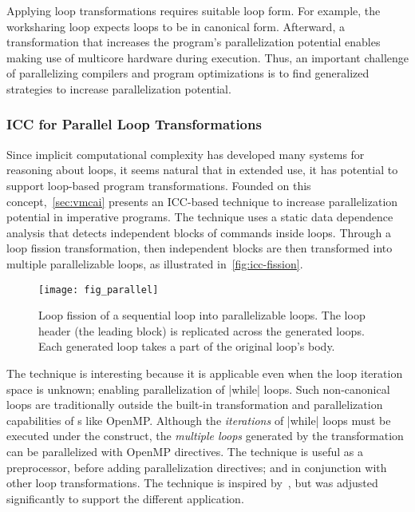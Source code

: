 Applying loop transformations requires suitable loop form.
For example, the worksharing loop expects loops to be in canonical form.
Afterward, a transformation that increases the program's parallelization potential enables making use of multicore hardware during execution.
Thus, an important challenge of parallelizing compilers and program optimizations is to find generalized strategies to increase parallelization potential.

\subsubsection{ICC for Parallel Loop Transformations}
\label{icc-fission}

Since implicit computational complexity has developed many systems for reasoning about loops, it seems natural that in extended use, it has potential to support loop-based program transformations.
Founded on this concept,~\autoref{sec:vmcai} presents an ICC-based technique to increase parallelization potential in imperative programs.
The technique uses a static data dependence analysis that detects independent blocks of commands inside loops.
Through a loop fission transformation,
then independent blocks are then transformed into multiple parallelizable loops, as illustrated in~\autoref{fig:icc-fission}.

\begin{figure}[h]
{\centering\texttt{[image: fig\_parallel]}}
\caption[Loop fission transformation]
{Loop fission of a sequential loop into parallelizable loops.
The loop header (the leading  block) is replicated across the generated loops.
Each generated loop takes a part of the original loop's body.}\label{fig:icc-fission}
\end{figure}

The technique is interesting because it is applicable even when the loop iteration space is unknown;
enabling parallelization of \eg \pr|while| loops.
Such non-canonical loops are traditionally outside the built-in transformation and parallelization capabilities of s like OpenMP\@.
Although the \emph{iterations} of \pr|while| loops must be executed under the  construct,
the \emph{multiple loops} generated by the transformation can be parallelized with OpenMP directives.
The technique is useful as a preprocessor, before adding parallelization directives;
and in conjunction with other loop transformations.
The technique is inspired by~\cite{moyen20172}, but was adjusted significantly to support the different application.

\clearpage
